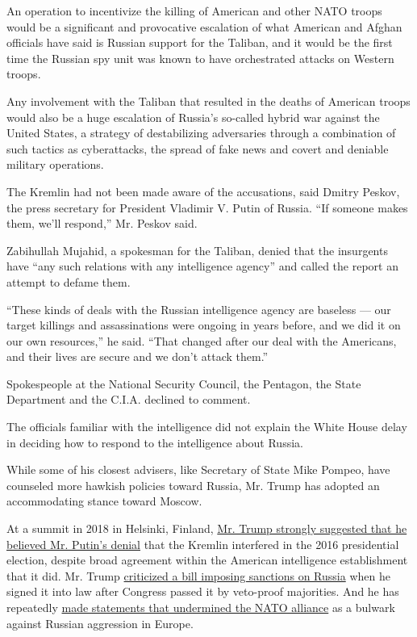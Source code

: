 An operation to incentivize the killing of American and other NATO
troops would be a significant and provocative escalation of what
American and Afghan officials have said is Russian support for the
Taliban, and it would be the first time the Russian spy unit was known
to have orchestrated attacks on Western troops.

Any involvement with the Taliban that resulted in the deaths of American
troops would also be a huge escalation of Russia's so-called hybrid war
against the United States, a strategy of destabilizing adversaries
through a combination of such tactics as cyberattacks, the spread of
fake news and covert and deniable military operations.

The Kremlin had not been made aware of the accusations, said Dmitry
Peskov, the press secretary for President Vladimir V. Putin of Russia.
``If someone makes them, we'll respond,'' Mr. Peskov said.

Zabihullah Mujahid, a spokesman for the Taliban, denied that the
insurgents have ``any such relations with any intelligence agency'' and
called the report an attempt to defame them.

``These kinds of deals with the Russian intelligence agency are baseless
--- our target killings and assassinations were ongoing in years before,
and we did it on our own resources,'' he said. ``That changed after our
deal with the Americans, and their lives are secure and we don't attack
them.''

Spokespeople at the National Security Council, the Pentagon, the State
Department and the C.I.A. declined to comment.

The officials familiar with the intelligence did not explain the White
House delay in deciding how to respond to the intelligence about Russia.

While some of his closest advisers, like Secretary of State Mike Pompeo,
have counseled more hawkish policies toward Russia, Mr. Trump has
adopted an accommodating stance toward Moscow.

At a summit in 2018 in Helsinki, Finland,
\href{https://www.nytimes.com/2018/07/16/world/europe/trump-putin-election-intelligence.html}{Mr.
Trump strongly suggested that he believed Mr. Putin's denial} that the
Kremlin interfered in the 2016 presidential election, despite broad
agreement within the American intelligence establishment that it did.
Mr. Trump
\href{https://www.nytimes.com/2017/08/02/world/europe/trump-russia-sanctions.html}{criticized
a bill imposing sanctions on Russia} when he signed it into law after
Congress passed it by veto-proof majorities. And he has repeatedly
\href{https://www.nytimes.com/2019/01/14/us/politics/nato-president-trump.html}{made
statements that undermined the NATO alliance} as a bulwark against
Russian aggression in Europe.


